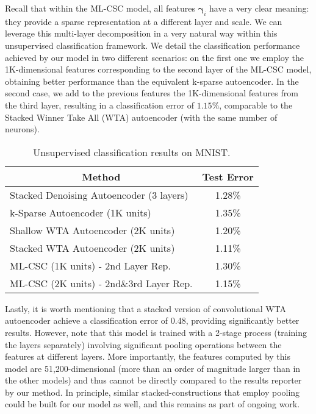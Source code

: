 \documentclass[10pt,journal]{IEEEtran}
\def\gama{{\boldsymbol \gamma}}
\theoremstyle{plain}
\theoremstyle{definition}
\begin{document}
Recall that within the ML-CSC model, all features $\gama_i$ have a very clear meaning: they provide a sparse representation at a different layer and scale. We can leverage this multi-layer decomposition in a very natural way within this unsupervised classification framework. We detail the classification performance achieved by our model in two different scenarios: on the first one we employ the
1K-dimensional features corresponding to the second layer of the ML-CSC model, obtaining better performance than the equivalent k-sparse autoencoder. In the second case, we add to the previous features the 1K-dimensional features from the third layer, resulting in a classification error of $1.15\%$, comparable to the Stacked Winner Take All (WTA) autoencoder (with the same number of neurons). 

\begin{table}[]
		\centering \small
		\begin{tabular}{|l|c|}
		\hline 
		\multicolumn{1}{|c|}{\textbf{Method}} & \textbf{Test Error} \\ \hline
		Stacked Denoising Autoencoder (3 layers) \cite{vincent2010stacked} & 1.28\%                        \\ \hline
		k-Sparse Autoencoder (1K units) \cite{makhzani2013k}		  & 1.35\%                        \\ \hline
		Shallow WTA Autoencoder (2K units) \cite{makhzani2015winner}  & 1.20\%                        \\ \hline
		Stacked WTA Autoencoder (2K units)\cite{makhzani2015winner}   & 1.11\%                        \\ \hline
		ML-CSC (1K units) - 2nd Layer Rep.                   & 1.30\%                        \\ \hline
		ML-CSC (2K units) - 2nd\&3rd Layer Rep.              & 1.15\%                        \\ \hline 
		\end{tabular}
		\caption{Unsupervised classification results on MNIST.}
		\label{Table:UnsupervisedResults}
	\end{table}

Lastly, it is worth mentioning that a stacked version of convolutional WTA autoencoder \cite{makhzani2015winner} achieve a classification error of 0.48, providing significantly better results. However, note that this model is trained with a 2-stage process (training the layers separately) involving significant pooling operations between the features at different layers. More importantly, the features computed by this model are 51,200-dimensional (more than an order of magnitude larger than in the other models) and thus cannot be directly compared to the results reporter by our method. In principle, similar stacked-constructions that employ pooling could be built for our model as well, and this remains as part of ongoing work.
 
\end{document}
